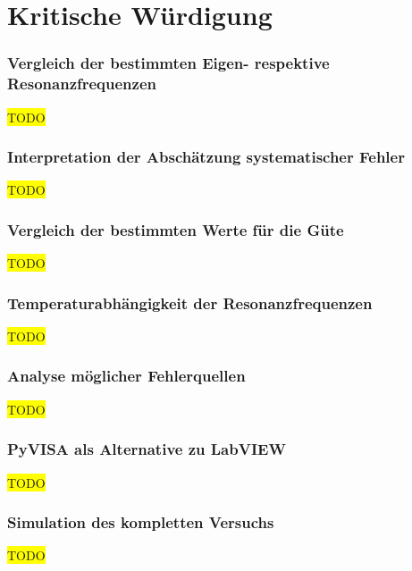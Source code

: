 \section{Kritische Würdigung}

\subsubsection*{Vergleich der bestimmten Eigen- respektive Resonanzfrequenzen}

\colorbox{yellow}{TODO}

\subsubsection*{Interpretation der Abschätzung systematischer Fehler}

\colorbox{yellow}{TODO}

\subsubsection*{Vergleich der bestimmten Werte für die Güte}

\colorbox{yellow}{TODO}

\subsubsection*{Temperaturabhängigkeit der Resonanzfrequenzen}

\colorbox{yellow}{TODO}

\subsubsection*{Analyse möglicher Fehlerquellen}

\colorbox{yellow}{TODO}

\subsubsection*{PyVISA als Alternative zu LabVIEW}

\colorbox{yellow}{TODO}

\subsubsection*{Simulation des kompletten Versuchs}

\colorbox{yellow}{TODO}
